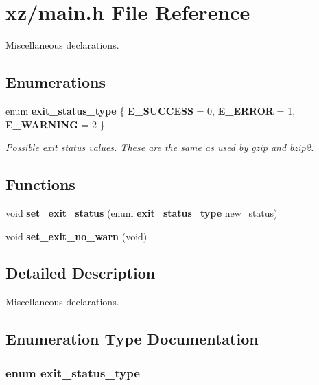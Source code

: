 \section{xz/main.h File Reference}
\label{main_8h}


Miscellaneous declarations.  


\subsection*{Enumerations}
\begin{DoxyCompactItemize}
\item 
enum {\bf exit\-\_\-status\-\_\-type} \{ {\bfseries E\-\_\-\-S\-U\-C\-C\-E\-S\-S} =  0, 
{\bfseries E\-\_\-\-E\-R\-R\-O\-R} =  1, 
{\bfseries E\-\_\-\-W\-A\-R\-N\-I\-N\-G} =  2
 \}
\begin{DoxyCompactList}\small\item\em Possible exit status values. These are the same as used by gzip and bzip2. \end{DoxyCompactList}\end{DoxyCompactItemize}
\subsection*{Functions}
\begin{DoxyCompactItemize}
\item 
void {\bf set\-\_\-exit\-\_\-status} (enum {\bf exit\-\_\-status\-\_\-type} new\-\_\-status)
\item 
void {\bf set\-\_\-exit\-\_\-no\-\_\-warn} (void)
\end{DoxyCompactItemize}


\subsection{Detailed Description}
Miscellaneous declarations. 

\subsection{Enumeration Type Documentation}
\subsubsection[{exit\-\_\-status\-\_\-type}]{\setlength{\rightskip}{0pt plus 5cm}enum {\bf exit\-\_\-status\-\_\-type}}\label{main_8h_af872d4d5c51b96938b58f0c59b6c3c37}


